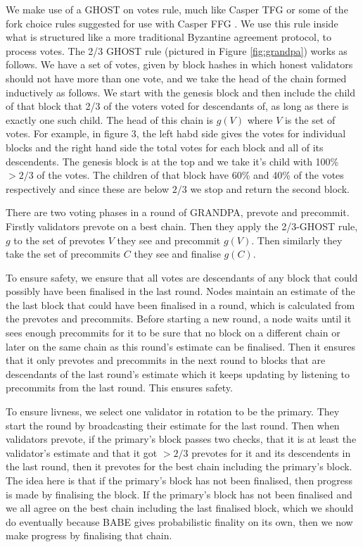 We make use of a GHOST on votes rule, much like Casper TFG \cite{CasperTFG} or some of the fork choice rules suggested for use with Casper FFG \cite{CasperFFG}. We use this rule inside what is structured like a more traditional Byzantine agreement protocol, to process votes. The 2/3 GHOST rule (pictured in Figure \ref{fig:grandpa})  works as follows. We have a set of votes, given by block hashes in which honest validators should not have more than one vote, and we take the head of the chain formed inductively as follows. We start with the genesis block and then include the child of that block that 2/3 of the voters voted for descendants of, as long as there is exactly one such child. The head of this chain is $g(V)$ where $V$ is the set of votes. For example, in figure 3, the left habd side gives the votes for individual blocks and the right hand side the total votes for each block and all of its descendents. The genesis block is at the top and we take it's child with 100\% $> 2/3$ of the votes. The children of that block have 60\% and 40\% of the votes respectively and since these are below $2/3$ we stop and return the second block.

There are two voting phases in a round of GRANDPA, prevote and precommit. Firstly validators prevote on a best chain. Then they apply the 2/3-GHOST rule, $g$ to the set of prevotes $V$ they see and precommit $g(V)$. Then similarly they take the set of precommits $C$ they see and finalise $g(C)$.

To ensure safety, we ensure that all votes are descendants of any block that could possibly have been finalised in the last round. Nodes maintain an estimate of the the last block that could have been finalised in a round, which is calculated from the prevotes and precommits. Before starting a new round, a node waits until it sees enough precommits for it to be sure that no block on a different chain or later on the same chain as this round's estimate can be finalised. Then it ensures that it only prevotes and precommits in the next round to blocks that are descendants of the last round's estimate which it keeps updating by listening to precommits from the last round. This ensures safety.

To ensure livness, we select one validator in rotation to be the primary. They start the round by broadcasting their estimate for the last round. Then when validators prevote, if the primary's block passes two checks, that it is at least the validator's estimate and that it got $>2/3$ prevotes for it and its descendents in the last round, then it prevotes for the best chain including the primary's block. The idea here is that if the primary's block has not been finalised, then progress is made by finalising the block. If the primary's block has not been finalised and we all agree on the best chain including the last finalised block, which we should do eventually because BABE gives probabilistic finality on its own, then we now make progress by finalising that chain.
  


